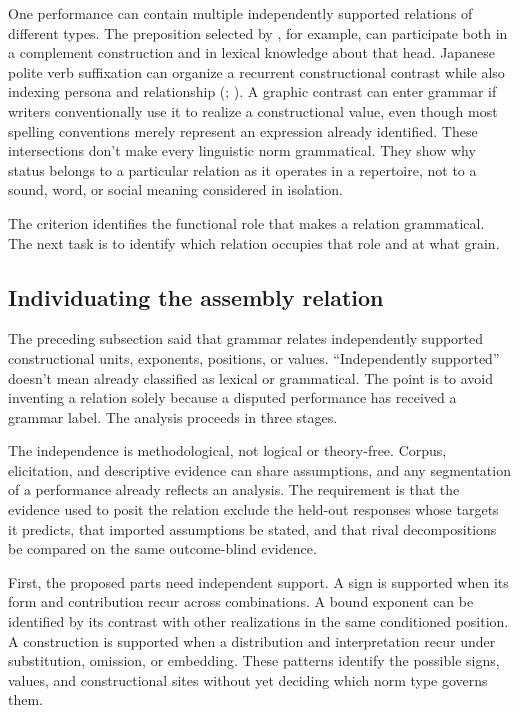 \documentclass[12pt,letterpaper]{article}
\begin{document}
One performance can contain multiple independently supported relations of
different types. The preposition selected by , for example, can
participate both in a complement construction and in lexical
knowledge about that head. Japanese polite verb suffixation can organize a
recurrent constructional contrast while also indexing persona and relationship
(\citealp[45--64]{cook2008speechstyle};
\citealp[50--53]{ide2005}). A graphic contrast can enter grammar if
writers conventionally use it to realize a constructional value, even though most
spelling conventions merely represent an expression already identified. These
intersections don't make every linguistic norm grammatical. They show why status
belongs to a particular relation as it operates in a repertoire, not to a sound, word,
or social meaning considered in isolation.

The criterion identifies the functional role that makes a relation grammatical.
The next task is to identify which relation occupies that role and at what grain.

\subsection{Individuating the assembly relation}
\label{sec:individuation}

The preceding subsection said that grammar relates independently supported
constructional units, exponents, positions, or values. \enquote{Independently
supported} doesn't mean already
classified as lexical or grammatical. The point is to avoid inventing a relation
solely because a disputed performance has received a grammar label. The analysis
proceeds in three stages.

The independence is methodological, not logical or theory-free. Corpus,
elicitation, and descriptive evidence can share assumptions, and any segmentation
of a performance already reflects an analysis. The requirement is that the
evidence used to posit the relation exclude the held-out responses whose targets
it predicts, that imported assumptions be stated, and that rival decompositions
be compared on the same outcome-blind evidence.

First, the proposed parts need independent support. A sign is supported when its
form and contribution recur across combinations. A bound exponent can be
identified by its contrast with other realizations in the same conditioned
position. A construction is supported when a distribution and interpretation
recur under substitution, omission, or embedding. These patterns identify the
possible signs, values, and constructional sites without yet deciding which norm
type governs them.
\end{document}
